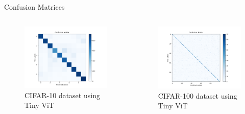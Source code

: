 \begin{frame}[fragile]{Confusion Matrices}
  \begin{columns}
    \begin{column}{0.3\textwidth}
      \begin{figure}[!ht]
        \includegraphics[width=\textwidth]{images/cifar10_cm.png}
        \small CIFAR-10 dataset using Tiny ViT
      \end{figure}
    \end{column}

    \begin{column}{0.3\textwidth}
      \begin{figure}[!ht]
        \includegraphics[width=\textwidth]{images/cifar100_cm.png}
        \small CIFAR-100 dataset using Tiny ViT
      \end{figure}
    \end{column}


\end{columns}
\end{frame}
